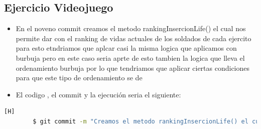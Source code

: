\documentclass{article}
\begin{document}
		\subsection{Ejercicio Videojuego}
	\begin{itemize}	
		\item En el noveno commit creamos el metodo rankingInsercionLife() el cual nos permite dar con el ranking de vidas actuales de los soldados de cada ejercito para esto etndriamos que aplcar casi la misma logica que aplicamos con burbuja pero en este caso seria aprte de esto tambien la logica que lleva el ordenamiento burbuja por lo que tendriamos que aplicar ciertas condiciones para que este tipo de ordenamiento se de
		\item El codigo , el commit y la ejecución seria el siguiente:
	\end{itemize}	
	\begin{lstlisting}[language=bash,caption={Commit}][H]
		$ git commit -m "Creamos el metodo rankingInsercionLife() el cual nos permite dar con el ranking de vidas actuales de los soldados de cada ejercito para esto etndriamos que aplcar casi la misma logica que aplicamos con burbuja pero en este caso seria aprte de esto tambien la logica que lleva el ordenamiento burbuja por lo que tendriamos que aplicar ciertas condiciones para que este tipo de ordenamiento se de"
	\end{lstlisting}	
\end{document}
